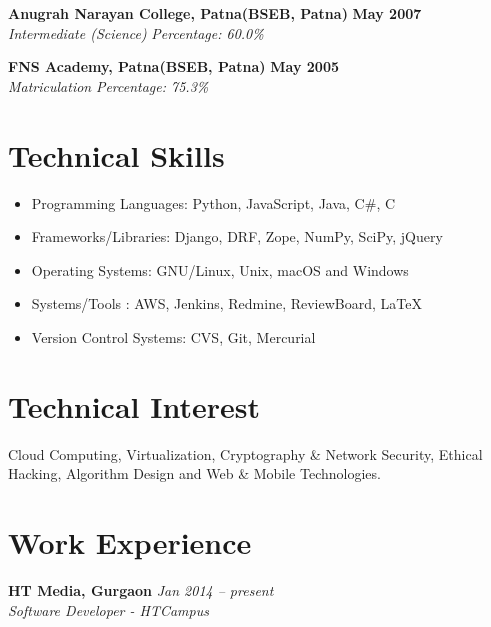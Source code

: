 \documentclass[margin,line]{resume}
\begin{document}
\begin{resume}
    \textbf{Anugrah Narayan College, Patna(BSEB, Patna)} \hfill \textbf{May 2007}\vspace{0mm}\\\vspace{0mm}%
    \textsl{Intermediate (Science)} \hfill \textsl{Percentage: 60.0\%}

    \textbf{FNS Academy, Patna(BSEB, Patna)} \hfill \textbf{May 2005}\vspace{0mm}\\\vspace{0mm}%
    \textsl{Matriculation } \hfill \textsl{Percentage: 75.3\%}
    \section{\mysidestyle Technical Skills}
     \begin{itemize}
      \item Programming Languages: Python, JavaScript, Java, C\#, C
      \item Frameworks/Libraries: Django, DRF, Zope, NumPy, SciPy, jQuery
      \item Operating Systems: GNU/Linux, Unix, macOS and Windows
      \item Systems/Tools : AWS, Jenkins, Redmine, ReviewBoard, \LaTeX
      \item Version Control Systems: CVS, Git, Mercurial      
     \end{itemize}
     \section{\mysidestyle Technical Interest}
        Cloud Computing, Virtualization, Cryptography \& Network Security, Ethical Hacking, Algorithm Design and Web \& Mobile Technologies.
    \section{\mysidestyle Work Experience}

    \textbf{HT Media, Gurgaon} \hfill \textsl{Jan 2014 -- present} \vspace{0mm}\\\vspace{0mm}%
           \textsl{Software Developer - HTCampus}\\
    \begin{itemize}
    

\end{itemize}
\end{resume}
\end{document}

